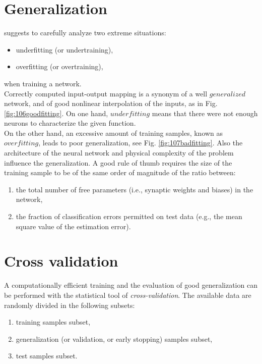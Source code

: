 \section{Generalization}
\label{sec:generalization}



\citet {RefWorks:158} suggests to carefully analyze two extreme situations:
\begin{itemize}
  \item {underfitting (or undertraining),}
  \item {overfitting (or overtraining),}
\end{itemize}
when training a network.\\
Correctly computed input-output mapping is a synonym of a well $generalized$
network, and of good nonlinear interpolation of the inputs, as in Fig. 
\ref{fig:106goodfitting}. 
On one hand, $underfitting$ means that there were not enough neurons to
characterize the given function.\\
On the other hand, an excessive amount of
training samples, known as $overfitting$, leads to poor generalization, see 
Fig. \ref{fig:107badfitting}. Also the architecture of the neural network and
physical complexity of the problem influence the generalization.
A good rule of thumb requires the size of the training sample to be of the same
order of magnitude of the ratio between:
\begin{enumerate}[label=(\alph*)]
  \item{the total number of free parameters (i.e., synaptic weights and biases)
  in the network,}
  \item{the fraction of classification errors permitted on test data (e.g., the
  mean square value of the estimation error).}
\end{enumerate}

\section{Cross validation}
\label{sec:crossvalidation}

A computationally efficient training and the evaluation of good generalization
can be performed with the statistical tool of \textit{cross-validation}.
The available data are randomly divided in the following subsets:

\begin{enumerate}
  \item{training samples subset,}
  \item{generalization (or validation, or early stopping) samples subset,}
  \item{test samples subset.}
\end{enumerate}

